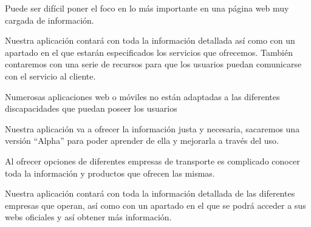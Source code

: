 \vspace{0.5cm}

\begin{problema}
      Puede ser difícil poner el foco en lo más importante en una página web muy cargada de información.

      {\centering
      \begin{vision}\justifying\noindent
            Nuestra aplicación contará con toda la información detallada así como con un apartado en el que estarán especificados los servicios que ofrecemos. También contaremos con una serie de recursos para que los usuarios puedan comunicarse con el servicio al cliente.
      \end{vision}}
\end{problema}

\vspace{0.5cm}

\begin{problema}

      Numerosas aplicaciones web o móviles no están adaptadas a las diferentes
      discapacidades que puedan poseer los usuarios

            {\centering
                  \begin{vision}\justifying\noindent
                        Nuestra aplicación va a ofrecer la información justa y necesaria, sacaremos una versión “Alpha” para poder aprender de ella y mejorarla a través del uso.
                  \end{vision}}
\end{problema}

\vspace{0.5cm}

\begin{problema}

      Al ofrecer opciones de diferentes empresas de transporte es complicado conocer
      toda la información y productos que ofrecen las mismas.

            {\centering
                  \begin{vision}\justifying\noindent
                        Nuestra aplicación contará con toda la información detallada de las diferentes empresas que operan, así como con un apartado en el que se podrá acceder a sus webs oficiales y así obtener más información.
                  \end{vision}}
\end{problema}

\vspace{0.5cm}

